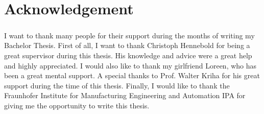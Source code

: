 \chapter*{Acknowledgement}
%
\paragraph{}
I want to thank many people for their support during the months of writing my Bachelor Thesis.
First of all, I want to thank Christoph Hennebold for being a great supervisor during this thesis. His knowledge and advice were a great help and highly appreciated.
I would also like to thank my girlfriend Loreen, who has been a great mental support. 
A special thanks to Prof. Walter Kriha for his great support during the time of this thesis.
Finally, I would like to thank the Fraunhofer Institute for Manufacturing Engineering and Automation IPA for giving me the opportunity to write this thesis.

